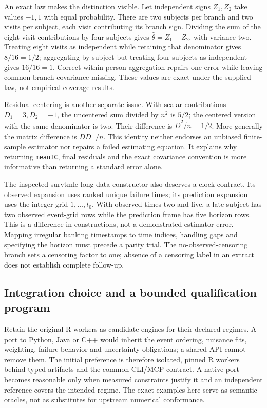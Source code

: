 An exact law makes the distinction visible. Let independent signs $Z_1,Z_2$
take values $-1,1$ with equal probability. There are two subjects per branch
and two visits per subject, each visit contributing its branch sign. Dividing
the sum of the eight visit contributions by four subjects gives
$\widehat\theta=Z_1+Z_2$, with variance two. Treating eight visits as independent
while retaining that denominator gives $8/16=1/2$; aggregating by subject but
treating four subjects as independent gives $16/16=1$. Correct within-person
aggregation repairs one error while leaving common-branch covariance missing.
These values are exact under the supplied law, not empirical coverage results.
\citep{exec23_longr_reference}

Residual centering is another separate issue. With scalar contributions
$D_1=3,D_2=-1$, the uncentered sum divided by $n^2$ is $5/2$; the centered
version with the same denominator is two. Their difference is
$\bar D^2/n=1/2$. More generally the matrix difference is
$\bar D\bar D^\top/n$. This identity neither endorses an unbiased finite-sample
estimator nor repairs a failed estimating equation. It explains why returning
\texttt{meanIC}, final residuals and the exact covariance convention is more
informative than returning a standard error alone. \citep{exec23_longr_reference}

The inspected survtmle long-data constructor also deserves a clock contract.
Its observed expansion uses ranked unique failure times; its prediction
expansion uses the integer grid $1,\ldots,t_0$. With observed times two and
five, a late subject has two observed event-grid rows while the prediction
frame has five horizon rows. This is a difference in constructions, not a
demonstrated estimator error. Mapping irregular banking timestamps to time
indices, handling gaps and specifying the horizon must precede a parity trial.
The no-observed-censoring branch sets a censoring factor to one; absence of a
censoring label in an extract does not establish complete follow-up.
\citep{exec23_longr_survtmle,exec23_longr_reference}

\subsection{Integration choice and a bounded qualification program}
Retain the original R workers as candidate engines for their declared regimes.
A port to Python, Java or C++ would inherit the event ordering, nuisance fits,
weighting, failure behavior and uncertainty obligations; a shared API cannot
remove them. The initial preference is therefore isolated, pinned R workers
behind typed artifacts and the common CLI/MCP contract. A native port becomes
reasonable only when measured constraints justify it and an independent
reference covers the intended regime. The exact examples here serve as
semantic oracles, not as substitutes for upstream numerical conformance.

